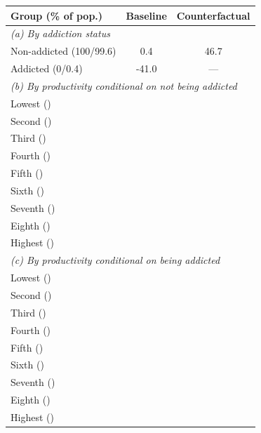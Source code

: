 \begin{table}
\footnotesize
\begin{tabular}{lcc}
\toprule
Group (\% of pop.) &
Baseline & 
Counterfactual\\
\midrule
\multicolumn{3}{l}{\textit{(a) By addiction status}}\\
Non-addicted (100/99.6) & 0.4 & 46.7 \\
Addicted (0/0.4) & -41.0 & --- \\
\midrule
\multicolumn{3}{l}{\textit{(b) By productivity conditional on not being addicted}}\\
Lowest () & & \\
Second () &  &  \\
Third () &  &  \\
Fourth () & &  \\
Fifth () &  &  \\
Sixth () &  &  \\
Seventh () &  &  \\
Eighth () &  &  \\
Highest () & &  \\
\midrule
\multicolumn{3}{l}{\textit{(c) By productivity conditional on being addicted}}\\
Lowest () & & \\
Second () &  &  \\
Third () &  &  \\
Fourth () & &  \\
Fifth () &  &  \\
Sixth () &  &  \\
Seventh () &  &  \\
Eighth () &  &  \\
Highest () & &  \\
\bottomrule
\bottomrule
\end{tabular}
\end{table}